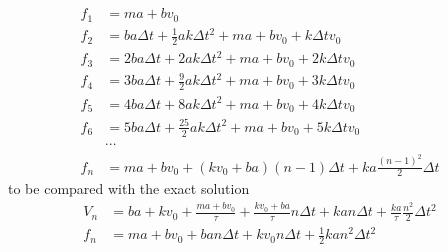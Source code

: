 \documentclass{article}
\begin{document}
\begin{appendix}
\begin{align*}
\\
f_1 &= m a+b v_0\\
f_2 &= b a \Delta t+\frac{1}{2} a k \Delta t^2+m a+b v_0+k \Delta t v_0\\
f_3 &= 2 b a \Delta t+2 a k \Delta t^2+m a+b v_0+2 k \Delta t v_0\\
f_4 &= 3 b a \Delta t+\frac{9}{2} a k \Delta t^2+m a+b v_0+3 k \Delta t v_0\\
f_5 &= 4 b a \Delta t+8 a k \Delta t^2+m a+b v_0+4 k \Delta t v_0\\
f_6 &= 5 b a \Delta t+\frac{25}{2} a k \Delta t^2+m a+b v_0+5 k \Delta t v_0\\
&\cdots\\
f_n &= m a + b v_0 + (k v_0  + b a) (n-1) \Delta t + k a \frac{(n-1)^2}{2} \Delta t
\end{align*}
to be compared with the exact solution
\begin{align}
V_n &= b a + k v_0  + \frac{m a + b v_0}{\tau}  + \frac{k v_0 + b a }{\tau}  n \Delta t
 + k a n \Delta t + \frac{k a}{\tau}  \frac{n^2}{2} \Delta t^2\\
f_n &= m a + b v_0 + b a n \Delta t + k v_0 n \Delta t + \frac{1}{2} k a n^2 \Delta t^2
\end{align}

\end{appendix}
\end{document}
